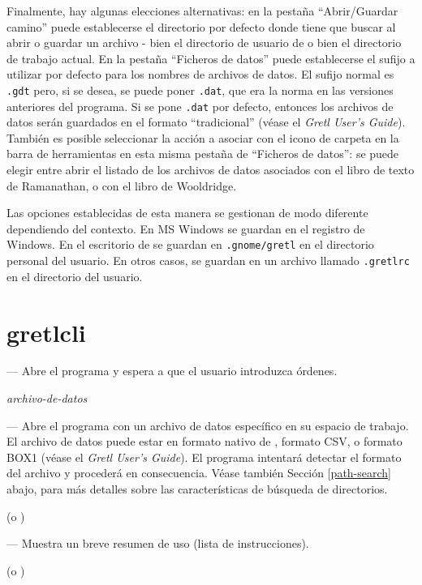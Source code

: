 Finalmente, hay algunas elecciones alternativas: en la pestaña
``Abrir/Guardar camino'' puede establecerse el directorio por defecto
donde  tiene que buscar al abrir o guardar un archivo -
bien el directorio de usuario de  o bien el directorio de
trabajo actual.  En la pestaña ``Ficheros de datos'' puede
establecerse el sufijo a utilizar por defecto para los nombres de
archivos de datos. El sufijo normal es \texttt{.gdt} pero, si se
desea, se puede poner \texttt{.dat}, que era la norma en las versiones
anteriores del programa. Si se pone \texttt{.dat} por defecto,
entonces los archivos de datos serán guardados en el formato
``tradicional'' (véase el \emph{Gretl User's Guide}).  También es
posible seleccionar la acción a asociar con el icono de carpeta en la
barra de herramientas en esta misma pestaña de ``Ficheros de datos'':
se puede elegir entre abrir el listado de los archivos de datos
asociados con el libro de texto de Ramanathan, o con el libro de
Wooldridge.

Las opciones establecidas de esta manera se gestionan de modo
diferente dependiendo del contexto. En MS Windows se guardan en el
registro de Windows. En el escritorio de  se guardan en
\texttt{.gnome/gretl} en el directorio personal del usuario. En otros
casos, se guardan en un archivo llamado \texttt{.gretlrc} en el
directorio del usuario.
    

\section{gretlcli}
\label{optarg2}


--- Abre el programa y espera a que el usuario introduzca órdenes.

 \textsl{archivo-de-datos}

--- Abre el programa con un archivo de datos específico en su espacio
de trabajo. El archivo de datos puede estar en formato nativo de
, formato CSV, o formato BOX1 (véase el \emph{Gretl User's
  Guide}). El programa intentará detectar el formato del archivo y
procederá en consecuencia. Véase también Sección \ref{path-search}
abajo, para más detalles sobre las características de búsqueda de
directorios.

 (o )

--- Muestra un breve resumen de uso (lista de instrucciones).

 (o )

